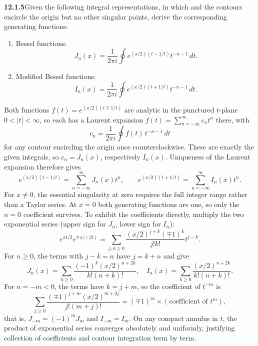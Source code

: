 \par\bigskip
\noindent\textbf{12.1.5}\quad Given the following integral representations, in
which  and the contours encircle the origin  but no other singular points, derive
the corresponding generating functions:
\begin{enumerate}
\item[(a)] Bessel functions:
  \[
  J_{n}(x)=\frac{1}{2\pi i}\oint e^{(x/2)(t-1/t)}t^{-n-1}\,dt.
  \]
\item[(b)] Modified Bessel functions:
  \[
  I_{n}(x)=\frac{1}{2\pi i}\oint e^{(x/2)(t+1/t)}t^{-n-1}\,dt.
  \]
\end{enumerate}
\solution
Both functions $f(t)=e^{(x/2)(t\mp1/t)}$ are analytic in the
punctured $t$-plane $0<|t|<\infty$, so each has a Laurent expansion
$f(t)=\sum_{n=-\infty}^{\infty}c_nt^n$ there, with
\[
c_n=\frac1{2\pi i}\oint f(t)\,t^{-n-1}\,dt
\]
for any contour encircling the origin once counterclockwise. These are
exactly the given integrals, so $c_n=J_n(x)$, respectively $I_n(x)$.
Uniqueness of the Laurent expansion therefore gives
\[
\boxed{e^{(x/2)(t-1/t)}=\sum_{n=-\infty}^{\infty}J_n(x)t^n},
\qquad
\boxed{e^{(x/2)(t+1/t)}=\sum_{n=-\infty}^{\infty}I_n(x)t^n}.
\]
For $x\ne0$, the essential singularity at zero requires the full integer
range rather than a Taylor series. At $x=0$ both generating functions
are one, so only the $n=0$ coefficient survives.
To exhibit the coefficients directly, multiply the two exponential series
(upper sign for $J_n$, lower sign for $I_n$):
\[
e^{xt/2}e^{\mp x/(2t)}
=\sum_{j,k\ge0}\frac{(x/2)^{j+k}(\mp1)^k}{j!k!}t^{j-k}.
\]
For $n\ge0$, the terms with $j-k=n$ have $j=k+n$ and give
\[
J_n(x)=\sum_{k\ge0}\frac{(-1)^k(x/2)^{n+2k}}{k!(n+k)!},\quad
I_n(x)=\sum_{k\ge0}\frac{(x/2)^{n+2k}}{k!(n+k)!}.
\]
For $n=-m<0$, the terms have $k=j+m$, so the coefficient of $t^{-m}$ is
\[
\sum_{j\ge0}\frac{(\mp1)^{j+m}(x/2)^{m+2j}}{j!(m+j)!}
=(\mp1)^m\times(\text{coefficient of }t^{m}),
\]
that is, $J_{-m}=(-1)^mJ_m$ and $I_{-m}=I_m$.
On any compact annulus in $t$, the product of exponential
series converges absolutely and uniformly, justifying collection of
coefficients and contour integration term by term.

